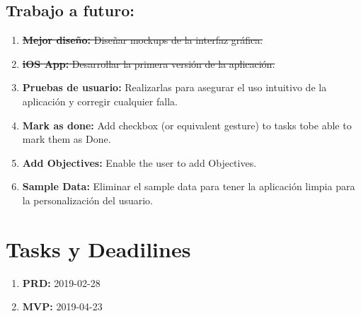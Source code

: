 \documentclass[]{article}
\begin{document}
\subsection{Trabajo a futuro:}
\begin{enumerate}
	\item \sout{\textbf{Mejor diseño:} Diseñar mockups de la interfaz gráfica.}
	\item \sout{\textbf{iOS App:} Desarrollar la primera versión de la aplicación.}
	\item \textbf{Pruebas de usuario:} Realizarlas para asegurar el uso intuitivo de la aplicación y corregir cualquier falla.
	\item \textbf{Mark as done:} Add checkbox (or equivalent gesture) to tasks tobe able to mark them as Done.
	\item \textbf{Add Objectives:} Enable the user to add Objectives.
	\item \textbf{Sample Data:} Eliminar el sample data para tener la aplicación limpia para la personalización del usuario.

\end{enumerate}
\section{Tasks y Deadilines}
\begin{enumerate}
	\item \textbf{PRD:} 2019-02-28
	\item \textbf{MVP:} 2019-04-23
\end{enumerate}
\end{document}
